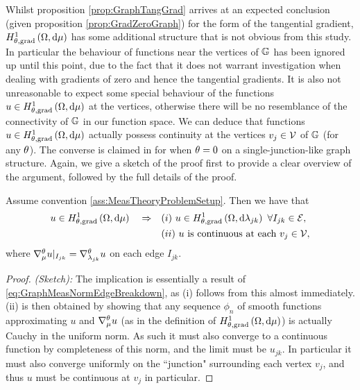 Whilst proposition \ref{prop:GraphTangGrad} arrives at an expected conclusion (given proposition \ref{prop:GradZeroGraph}) for the form of the tangential gradient, $H^1_{\theta, \mathrm{grad}}\left( \Omega, \mathrm{d}\mu \right)$ has some additional structure that is not obvious from this study.
In particular the behaviour of functions near the vertices of $\mathbb{G}$ has been ignored up until this point, due to the fact that it does not warrant investigation when dealing with gradients of zero and hence the tangential gradients.
It is also not unreasonable to expect some special behaviour of the functions $u\in H^1_{\theta, \mathrm{grad}}\left( \Omega, \mathrm{d}\mu \right)$ at the vertices, otherwise there will be no resemblance of the connectivity of $\mathbb{G}$ in our function space.
We can deduce that functions $u\in H^1_{\theta, \mathrm{grad}}\left( \Omega, \mathrm{d}\mu \right)$ actually possess continuity at the vertices $v_j\in \mathcal{V}$ of $\mathbb{G}$ (for any $\theta$).
The converse is claimed in \cite[Section~4]{zhikov2002homogenization} for when $\theta=0$ on a single-junction-like graph structure.
Again, we give a sketch of the proof first to provide a clear overview of the argument, followed by the full details of the proof.
\begin{theorem} \label{thm:CharOfGradSob}
	Assume convention \ref{ass:MeasTheoryProblemSetup}.
	Then we have that
	\begin{align*}
		u \in H^1_{\theta, \mathrm{grad}}\left( \Omega, \mathrm{d}\mu \right) \quad\Rightarrow\quad 
		& (i) \ u\in H^1_{\theta, \mathrm{grad}}\left( \Omega, \mathrm{d}\lambda_{jk} \right) \ \forall I_{jk}\in \mathcal{E}, \\
		& (ii) \ u \text{ is continuous at each } v_j\in \mathcal{V},
	\end{align*}
	where $\nabla^{\theta}_{\mu}u\vert_{I_{jk}} = \nabla^{\theta}_{\lambda_{jk}}u$ on each edge $I_{jk}$.
\end{theorem}
\begin{proof} \textit{(Sketch):} 
	The implication is essentially a result of \eqref{eq:GraphMeasNormEdgeBreakdown}, as (i) follows from this almost immediately.
	(ii) is then obtained by showing that any sequence $\phi_n$ of smooth functions approximating $u$ and $\nabla^{\theta}_\mu u$ (as in the definition of $H^1_{\theta, \mathrm{grad}}\left( \Omega, \mathrm{d}\mu \right)$) is actually Cauchy in the uniform norm.
	As such it must also converge to a continuous function by completeness of this norm, and the limit must be $u_{jk}$.
	In particular it must also converge uniformly on the ``junction" surrounding each vertex $v_j$, and thus $u$ must be continuous at $v_j$ in particular. \newline
\end{proof}
